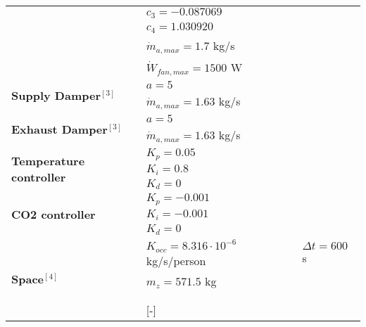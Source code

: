 \begin{table}[h!]
{\begin{tabular}{l|l|l}
                                          & $c_3=-0.087069$     &                    \\
                                          & $c_4=1.030920$     &                    \\
                                          & $\dot{m}_{a,max}=1.7$ kg/s   &                    \\
                                          & $\dot{W}_{fan,max}=1500$ W    &                    \\ \midrule
\multirow{2}{*}{\textbf{Supply Damper}$^{[3]}$}          &       $a=5$           &                    \\
                                          &       $\dot{m}_{a,max}=1.63$ kg/s           &                    \\\midrule
\multirow{2}{*}{\textbf{Exhaust Damper}$^{[3]}$}          &       $a=5$           &                    \\
                                          &       $\dot{m}_{a,max}=1.63$ kg/s          &                    \\\midrule
\multirow{3}{*}{\textbf{Temperature controller}}      &      $K_p=0.05$          &                    \\ 
                                          &      $K_i=0.8$          &                    \\ 
                                          &      $K_d=0$          &                    \\ \midrule
\multirow{3}{*}{\textbf{CO2 controller}}      &      $K_p=-0.001$          &                    \\ 
                                          &      $K_i=-0.001$          &                    \\ 
                                          &      $K_d=0$          &                    \\ \midrule
\multirow{9}{*}{\textbf{Space}$^{[4]}$}  &      $K_{occ}=8.316 \cdot 10^{-6}$ kg/s/person     &        $\Delta t=600$ s  \\ 
                                          &      $m_z=571.5$ kg          &                   \\ 
                                          &                     &                    \\ 
                                          &                     &                    \\ 
                                          &         [-]         &                    \\ 

\end{tabular}}
\end{table}
